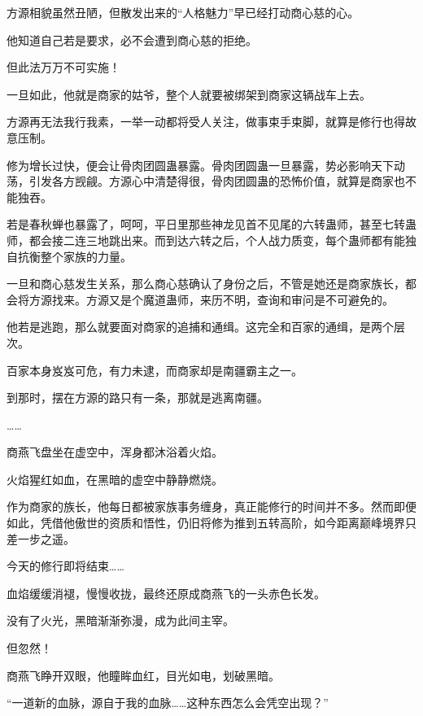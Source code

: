 \begin{this_body}
方源相貌虽然丑陋，但散发出来的“人格魅力”早已经打动商心慈的心。

他知道自己若是要求，必不会遭到商心慈的拒绝。

但此法万万不可实施！

一旦如此，他就是商家的姑爷，整个人就要被绑架到商家这辆战车上去。

方源再无法我行我素，一举一动都将受人关注，做事束手束脚，就算是修行也得故意压制。

修为增长过快，便会让骨肉团圆蛊暴露。骨肉团圆蛊一旦暴露，势必影响天下动荡，引发各方觊觎。方源心中清楚得很，骨肉团圆蛊的恐怖价值，就算是商家也不能独吞。

若是春秋蝉也暴露了，呵呵，平日里那些神龙见首不见尾的六转蛊师，甚至七转蛊师，都会接二连三地跳出来。而到达六转之后，个人战力质变，每个蛊师都有能独自抗衡整个家族的力量。

一旦和商心慈发生关系，那么商心慈确认了身份之后，不管是她还是商家族长，都会将方源找来。方源又是个魔道蛊师，来历不明，查询和审问是不可避免的。

他若是逃跑，那么就要面对商家的追捕和通缉。这完全和百家的通缉，是两个层次。

百家本身岌岌可危，有力未逮，而商家却是南疆霸主之一。

到那时，摆在方源的路只有一条，那就是逃离南疆。

……

商燕飞盘坐在虚空中，浑身都沐浴着火焰。

火焰猩红如血，在黑暗的虚空中静静燃烧。

作为商家的族长，他每日都被家族事务缠身，真正能修行的时间并不多。然而即便如此，凭借他傲世的资质和悟性，仍旧将修为推到五转高阶，如今距离巅峰境界只差一步之遥。

今天的修行即将结束……

血焰缓缓消褪，慢慢收拢，最终还原成商燕飞的一头赤色长发。

没有了火光，黑暗渐渐弥漫，成为此间主宰。

但忽然！

商燕飞睁开双眼，他瞳眸血红，目光如电，划破黑暗。

“一道新的血脉，源自于我的血脉……这种东西怎么会凭空出现？”

\end{this_body}

